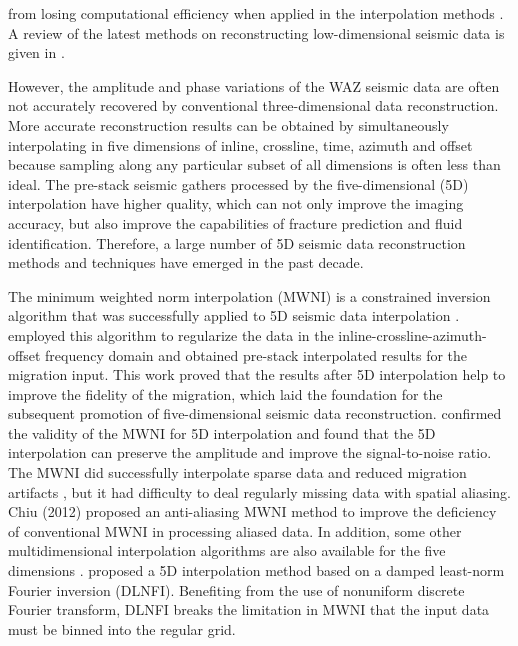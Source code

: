 from losing computational efficiency when applied in the interpolation methods \cite[]{ronen,canning1996,fomel2003}. A review of the latest methods on reconstructing low-dimensional seismic data is given in \cite{yangkang2019sg}.

However, the amplitude and phase variations of the WAZ seismic data are often not accurately recovered by conventional three-dimensional data reconstruction. More accurate reconstruction results can be obtained by simultaneously interpolating in five dimensions of inline, crossline, time, azimuth and offset because sampling along any particular subset of all dimensions is often less than ideal. The pre-stack seismic gathers processed by the five-dimensional (5D) interpolation have higher quality, which can not only improve the imaging accuracy, but also improve the capabilities of fracture prediction and fluid identification. Therefore, a large number of 5D seismic data reconstruction methods and techniques have emerged in the past decade.

The minimum weighted norm interpolation (MWNI) is a constrained inversion algorithm that was successfully applied to 5D seismic data interpolation \citep{Liubin2004, Trad2007, Trad2009}. \cite{Trad2007} employed this algorithm to regularize the data in the inline-crossline-azimuth-offset frequency domain and obtained pre-stack interpolated results for the migration input. This work proved that the results after 5D interpolation help to improve the fidelity of the migration, which laid the foundation for the subsequent promotion of five-dimensional seismic data reconstruction. \cite{Downton2008} confirmed the validity of the MWNI for 5D interpolation and found that the 5D interpolation can preserve the amplitude and improve the signal-to-noise ratio. The MWNI did successfully interpolate sparse data and reduced migration artifacts \citep{Trad2009}, but it had difficulty to deal regularly missing data with spatial aliasing. Chiu (2012) proposed an anti-aliasing MWNI method to improve the deficiency of conventional MWNI in processing aliased data. 
In addition, some other multidimensional interpolation algorithms are also available for the five dimensions \citep{Chopra2013}. \cite{Jin2010} proposed a 5D interpolation method based on a damped least-norm Fourier inversion (DLNFI). Benefiting from the use of nonuniform discrete Fourier transform, DLNFI breaks the limitation in MWNI that the input data must be binned into the regular grid. 

